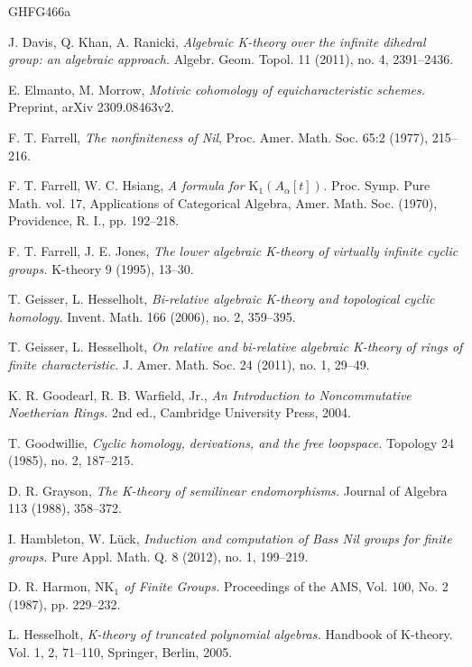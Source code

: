 \documentclass[reqno,11pt,letterpaper]{amsart}
\theoremstyle{plain}
\numberwithin{equation}{subsection}
\theoremstyle{remark}
\theoremstyle{plain}
\theoremstyle{definition}\newtheorem*{notation}{Notation}
\newcommand{\RK}{\mathrm{K}}
\newcommand{\RNK}{\mathrm{NK}}
\begin{document}
\begin{thebibliography}{GHFG466a}
 
 J. Davis, Q. Khan, A. Ranicki, \emph{Algebraic K-theory over the infinite dihedral group: an algebraic approach.}
Algebr. Geom. Topol. 11 (2011), no. 4, 2391--2436.


 E. Elmanto, M. Morrow, \emph{Motivic cohomology of equicharacteristic schemes.} Preprint, arXiv 2309.08463v2.

 

 F. T. Farrell, \textit{The nonfiniteness of Nil}, Proc. Amer. Math. Soc. 65:2 (1977), 215--216. 

 F. T. Farrell, W. C. Hsiang, \emph{A formula for $\RK_1(A_\alpha[t])$.} Proc. Symp. Pure Math. vol. 17,
Applications of Categorical Algebra, Amer. Math. Soc. (1970), Providence, R. I., pp. 192--218.

 F. T. Farrell, J. E. Jones, \emph{The lower algebraic K-theory of virtually infinite cyclic groups.} $\RK$-theory
9 (1995), 13--30.

 

 T. Geisser, L. Hesselholt, \textit{Bi-relative algebraic K-theory and topological cyclic homology.} Invent. Math. 166 (2006), no. 2, 359--395.

  T. Geisser, L. Hesselholt, \textit{On relative and bi-relative algebraic  K-theory of rings of finite characteristic.} 
J. Amer. Math. Soc. 24 (2011), no. 1, 29--49.


 K. R. Goodearl, R. B. Warfield, Jr., \emph{An Introduction to Noncommutative Noetherian Rings.} 2nd ed., Cambridge University Press, 2004. 

  T. Goodwillie, \textit{Cyclic homology, derivations, and the free loopspace.} Topology 24 (1985), no. 2, 187--215. 

 D. R. Grayson, \emph{The K-theory of semilinear endomorphisms.}
Journal of Algebra 113 (1988), 358--372.

 

 I. Hambleton, W. L\"uck, \textit{Induction and computation of Bass Nil groups for finite groups.}  
Pure Appl. Math. Q. 8 (2012), no. 1, 199--219. 

 

 
 D. R. Harmon, \textit{$\RNK_1$ of Finite Groups.}
Proceedings of the AMS, Vol. 100, No. 2 (1987), pp. 229--232. 

  L. Hesselholt,  \textit{K-theory of truncated polynomial algebras.} Handbook of K-theory. Vol. 1, 2, 71--110, Springer, Berlin, 2005. 


\end{thebibliography}
\end{document}
